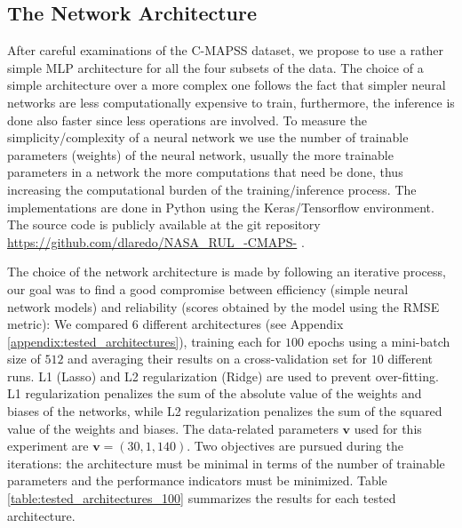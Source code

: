 \documentclass[preprint,12pt]{elsarticle}%
\begin{document}
\subsection{The Network Architecture}

After careful examinations of the C-MAPSS dataset, we propose to use a rather simple MLP architecture for all the four subsets of the data. The choice of a simple architecture over a more complex one follows the fact that simpler neural networks are less computationally expensive to train, furthermore, the inference is done also faster since less operations are involved. To measure the simplicity/complexity of a neural network we use the number of trainable parameters (weights) of the neural network, usually the more trainable parameters in a network the more computations that need be done, thus increasing the computational burden of the training/inference process. The implementations are done in Python using the Keras/Tensorflow environment. The source code is publicly available at the git repository \url{https://github.com/dlaredo/NASA_RUL_-CMAPS-} \cite{Laredo2018}.

The choice of the network architecture is made by following an iterative process, our goal was to find a good compromise between efficiency (simple neural network models) and reliability (scores obtained by the model using the RMSE metric): We compared 6 different architectures (see Appendix \ref{appendix:tested_architectures}), training each for $100$ epochs using a mini-batch size of $512$ and averaging their results on a cross-validation set for $10$ different runs. L1 (Lasso) and L2 regularization (Ridge) \cite{Buhlmann2011} are used to prevent over-fitting. L1 regularization penalizes the sum of the absolute value of the weights and biases of the networks, while L2 regularization penalizes the sum of the squared value of the weights and biases. The data-related parameters $\mathbf{v}$ used for this experiment are $\mathbf{v}= (30, 1, 140)$. Two objectives are pursued during the iterations: the architecture must be minimal in terms of the number of trainable parameters and the performance indicators must be minimized. Table \ref{table:tested_architectures_100} summarizes the results for each tested architecture.
\end{document}

